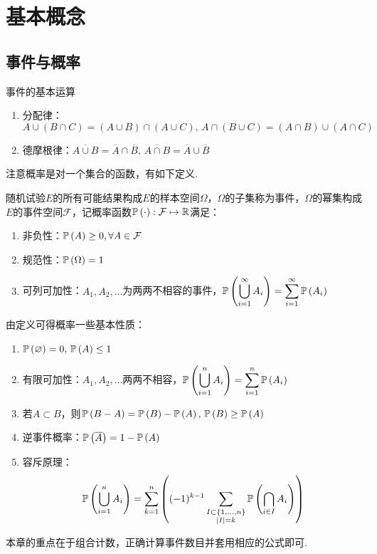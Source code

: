 
\section{基本概念}
\subsection{事件与概率}
\begin{proposition}事件的基本运算
	\begin{enumerate}
		\itemsep -3pt
		\item 分配律：$A\cup(B\cap C)=(A\cup B)\cap(A\cup C),\,A\cap(B\cup C)=(A\cap B)\cup(A\cap C)$
		\item 德摩根律：$\overline{A\cup B}=\overline{A}\cap\overline{B},\,\overline{A\cap B}=\overline{A}\cup\overline{B}$
	\end{enumerate}
\end{proposition}
注意概率是对一个集合的函数，有如下定义.
\begin{definition}[概率]
	随机试验$E$的所有可能结果构成$E$的样本空间$\Omega$，$\Omega$的子集称为事件，$\Omega$的幂集构成$E$的事件空间$\mathcal{F}$，记概率函数$\mathbb{P}\left(\cdot\right):\mathcal{F}\mapsto\mathbb{R}$满足：
	\begin{enumerate}
		\itemsep -3pt
		\item 非负性：$\mathbb{P}\left(A\right)\geq 0,\forall A\in\mathcal{F}$
		\item 规范性：$\mathbb{P}\left(\Omega\right)=1$
		\item 可列可加性：$A_1,A_2,\ldots$为两两不相容的事件，$\displaystyle \mathbb{P}\left(\bigcup_{i=1}^\infty A_i\right)=\sum_{i=1}^\infty \mathbb{P}\left(A_i\right)$
	\end{enumerate}
\end{definition}
由定义可得概率一些基本性质：
\begin{enumerate}
	\itemsep -3pt
	\item $\mathbb{P}\left(\varnothing\right)=0,\,\mathbb{P}\left(A\right)\leq 1$
	\item 有限可加性：$A_1,A_2,\ldots$两两不相容，$\displaystyle \mathbb{P}\left(\bigcup_{i=1}^n A_i\right)=\sum_{i=1}^n \mathbb{P}\left(A_i\right)$
	\item 若$A\subset B$，则$\mathbb{P}\left(B-A\right)=\mathbb{P}\left(B\right)-\mathbb{P}\left(A\right),\,\mathbb{P}\left(B\right)\geq \mathbb{P}\left(A\right)$
	\item 逆事件概率：$\mathbb{P}\left(\overline{A}\right)=1-\mathbb{P}\left(A\right)$
	\item 容斥原理：
	\[\mathbb{P}\left(\bigcup _{{i=1}}^{n}A_{i}\right)=\sum _{{k=1}}^{n}\left((-1)^{{k-1}}\sum _{\substack{I\subset \{1,\ldots ,n\}\\|I|=k}}\mathbb{P}\left(\bigcap _{{i\in I}}A_{i}\right)\right)\]
\end{enumerate}
\par 本章的重点在于组合计数，正确计算事件数目并套用相应的公式即可.

